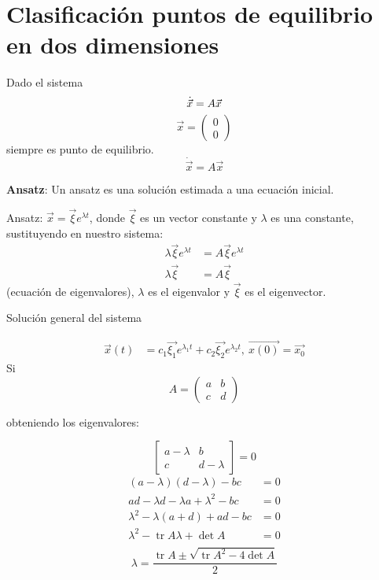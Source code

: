 \section{Clasificación puntos de equilibrio en dos dimensiones}

Dado el sistema
$$
\dot{\vec{x}}=A \vec{x} \\
$$
$$
\vec{x}=\begin{pmatrix} 0 \\ 0 \end{pmatrix} 
$$
siempre es punto de equilibrio.
$$
\dot{\vec{x}}=A \vec{x}
$$
\begin{tcolorbox}[colback=Black!4, colframe=White, title=Ansatz,fonttitle=\bfseries]
\textbf{Ansatz}: Un ansatz es una solución estimada a una ecuación inicial. 
\end{tcolorbox}

Ansatz: $\vec{x} = \vec{\xi}e^{\lambda t}$, donde $\vec{\xi}$ es un vector constante y $\lambda$ es una constante, sustituyendo en nuestro sistema:
$$
\begin{aligned}
  \lambda \vec{\xi} e^{\lambda t} &= A \vec{\xi} e^{\lambda t} \\
  \lambda \vec{\xi} &= A \vec{\xi}
\end{aligned}
$$
(ecuación de eigenvalores), $\lambda$ es el eigenvalor y $\vec{\xi}$ es el eigenvector. 
 \vspace{2mm}
 
Solución general del sistema

$$
\begin{aligned}
  \vec{x}(t) &= c_1\vec{\xi_1}e^{\lambda_1 t} + c_2 \vec{\xi_2} e^{\lambda_2 t} , \ \vec{x(0)}=\vec{x_0} 
\end{aligned}
$$
Si
$$
A = \begin{pmatrix} a & b \\ c & d \end{pmatrix} 
$$

obteniendo los eigenvalores:

$$
\begin{bmatrix} a - \lambda & b \\ c & d-\lambda \end{bmatrix} = 0
$$
$$
\begin{aligned}
  (a-\lambda)(d-\lambda)-bc &= 0 \\
  ad -\lambda d -\lambda a+\lambda^2-bc &= 0 \\
  \lambda^2-\lambda(a+d)+ad-bc &= 0 \\
  \lambda^2 - \operatorname{tr}A\lambda + \operatorname{det}A &= 0 \\ 
\end{aligned}
$$
$$
\lambda = \frac{\operatorname{tr}A \pm \sqrt{\operatorname{tr}A^2 - 4 \operatorname{det}A}}{2}
$$

